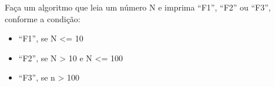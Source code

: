 
\question[10]

Faça um algoritmo que leia um número N e imprima ``F1'', ``F2'' ou ``F3'', conforme a condição:

\begin{itemize}
	\item ``F1'', se N <= 10
	\item ``F2'', se N > 10 e N <= 100
	\item ``F3'', se n > 100
\end{itemize}

